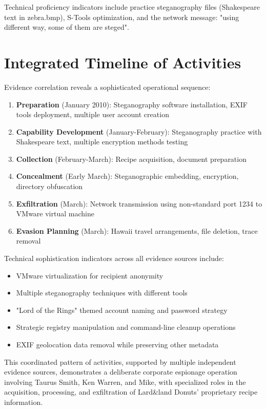Technical proficiency indicators include practice steganography files (Shakespeare text in zebra.bmp), S-Tools optimization, and the network message: "using different way, some of them are steged".

\section{Integrated Timeline of Activities}
Evidence correlation reveals a sophisticated operational sequence:

\begin{enumerate}
    \item \textbf{Preparation} (January 2010): Steganography software installation, EXIF tools deployment, multiple user account creation
    \item \textbf{Capability Development} (January-February): Steganography practice with Shakespeare text, multiple encryption methods testing
    \item \textbf{Collection} (February-March): Recipe acquisition, document preparation 
    \item \textbf{Concealment} (Early March): Steganographic embedding, encryption, directory obfuscation
    \item \textbf{Exfiltration} (March): Network transmission using non-standard port 1234 to VMware virtual machine
    \item \textbf{Evasion Planning} (March): Hawaii travel arrangements, file deletion, trace removal
\end{enumerate}

Technical sophistication indicators across all evidence sources include:
\begin{itemize}
    \item VMware virtualization for recipient anonymity
    \item Multiple steganography techniques with different tools 
    \item "Lord of the Rings" themed account naming and password strategy
    \item Strategic registry manipulation and command-line cleanup operations
    \item EXIF geolocation data removal while preserving other metadata
\end{itemize}

This coordinated pattern of activities, supported by multiple independent evidence sources, demonstrates a deliberate corporate espionage operation involving Taurus Smith, Ken Warren, and Mike, with specialized roles in the acquisition, processing, and exfiltration of Lard\&land Donuts' proprietary recipe information.